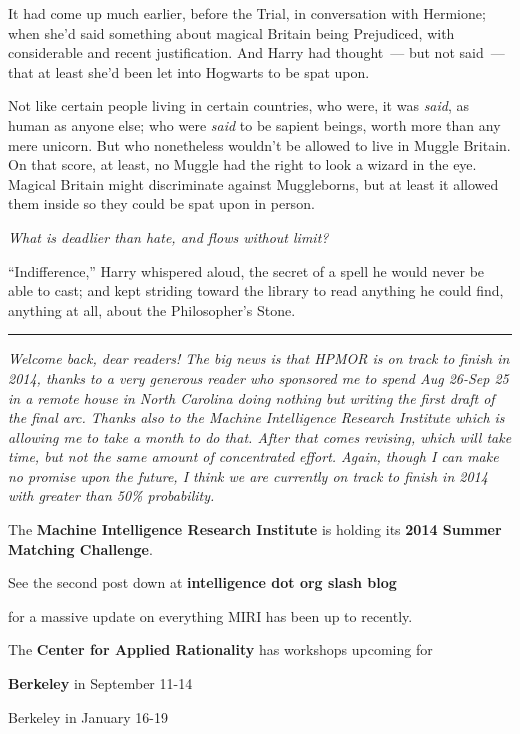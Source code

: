 It had come up much earlier, before the Trial, in conversation with Hermione; when she'd said something about magical Britain being Prejudiced, with considerable and recent justification. And Harry had thought~--- but not said~--- that at least she'd been let into Hogwarts to be spat upon.

Not like certain people living in certain countries, who were, it was \emph{said}, as human as anyone else; who were \emph{said} to be sapient beings, worth more than any mere unicorn. But who nonetheless wouldn't be allowed to live in Muggle Britain. On that score, at least, no Muggle had the right to look a wizard in the eye. Magical Britain might discriminate against Muggleborns, but at least it allowed them inside so they could be spat upon in person.

\emph{What is deadlier than hate, and flows without limit?}

``Indifference,'' Harry whispered aloud, the secret of a spell he would never be able to cast; and kept striding toward the library to read anything he could find, anything at all, about the Philosopher's Stone.

\begin{center}\rule{3in}{0.4pt}\end{center}

\emph{Welcome back, dear readers! The big news is that HPMOR is on track to finish in 2014, thanks to a very generous reader who sponsored me to spend Aug 26-Sep 25 in a remote house in North Carolina doing nothing but writing the first draft of the final arc. Thanks also to the Machine Intelligence Research Institute which is allowing me to take a month to do that. After that comes revising, which will take time, but not the same amount of concentrated effort. Again, though I can make no promise upon the future, I think we are currently on track to finish in 2014 with greater than 50\% probability.}

The \textbf{Machine Intelligence Research Institute} is holding its \textbf{2014 Summer Matching Challenge}.

See the second post down at \textbf{intelligence dot org slash blog}

for a massive update on everything MIRI has been up to recently.

The \textbf{Center for Applied Rationality} has workshops upcoming for

\textbf{Berkeley} in September 11-14

Berkeley in January 16-19

